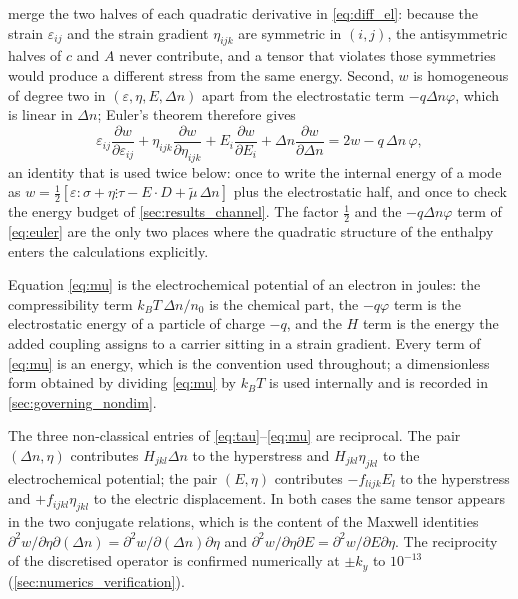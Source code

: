 merge the two halves of each quadratic derivative in \eqref{eq:diff_el}: because
the strain $\varepsilon_{ij}$ and the strain gradient $\eta_{ijk}$ are symmetric
in $(i,j)$, the antisymmetric halves of $c$ and $A$ never contribute, and a
tensor that violates those symmetries would produce a different stress from the
same energy.  Second, $w$ is homogeneous of degree two in
$(\varepsilon,\eta,E,\Delta n)$ apart from the electrostatic term $-q\Delta n
\varphi$, which is linear in $\Delta n$; Euler's theorem therefore gives
\begin{equation}
\label{eq:euler}
\varepsilon_{ij}\frac{\partial w}{\partial\varepsilon_{ij}}
+\eta_{ijk}\frac{\partial w}{\partial\eta_{ijk}}
+E_i\frac{\partial w}{\partial E_i}
+\Delta n\frac{\partial w}{\partial\Delta n}
=2w-q\,\Delta n\,\varphi ,
\end{equation}
an identity that is used twice below: once to write the internal energy of a mode
as $w=\tfrac12[\varepsilon:\sigma+\eta\vdots\tau-E\cdot D+\widetilde\mu\,\Delta n]$
plus the electrostatic half, and once to check the energy budget of
\cref{sec:results_channel}.  The factor $\tfrac12$ and the $-q\Delta n\varphi$
term of \eqref{eq:euler} are the only two places where the quadratic structure
of the enthalpy enters the calculations explicitly.

Equation \eqref{eq:mu} is the electrochemical potential of an electron in
joules: the compressibility term $k_BT\,\Delta n/n_0$ is the chemical part, the
$-q\varphi$ term is the electrostatic energy of a particle of charge $-q$, and
the $H$ term is the energy the added coupling assigns to a carrier sitting in a
strain gradient.  Every term of \eqref{eq:mu} is an energy, which is the convention used throughout; a dimensionless form obtained by dividing
\eqref{eq:mu} by $k_BT$ is used internally and is recorded in
\cref{sec:governing_nondim}.

The three non-classical entries of \eqref{eq:tau}--\eqref{eq:mu} are reciprocal.
The pair $(\Delta n,\eta)$ contributes $H_{jkl}\Delta n$ to the hyperstress and
$H_{jkl}\eta_{jkl}$ to the electrochemical potential; the pair $(E,\eta)$
contributes $-f_{lijk}E_l$ to the hyperstress and $+f_{ijkl}\eta_{jkl}$ to the
electric displacement.  In both cases the same tensor appears in the two
conjugate relations, which is the content of the Maxwell identities
$\partial^2w/\partial\eta\partial(\Delta n)=\partial^2w/\partial(\Delta
n)\partial\eta$ and $\partial^2w/\partial\eta\partial E=\partial^2w/\partial
E\partial\eta$.  The reciprocity of the discretised operator is confirmed
numerically at $\pm k_y$ to $10^{-13}$ (\cref{sec:numerics_verification}).

